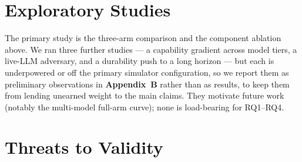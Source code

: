 \documentclass[11pt]{article}
\begin{document}
\section{Exploratory Studies}

The primary study is the three-arm comparison and the component ablation above.
We ran three further studies --- a capability gradient across model tiers, a
live-LLM adversary, and a durability push to a long horizon --- but each is
underpowered or off the primary simulator configuration, so we report them as
preliminary observations in \textbf{Appendix~B} rather than as results, to keep
them from lending unearned weight to the main claims. They motivate future work
(notably the multi-model full-arm curve); none is load-bearing for RQ1--RQ4.

\section{Threats to Validity}
\end{document}
